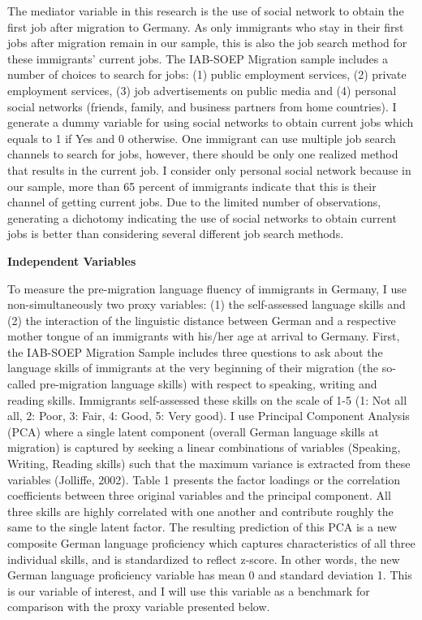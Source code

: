 \documentclass[12pt,a4paper]{article}
\begin{document}
The mediator variable in this research is the use of social network to obtain the first job after migration to Germany. As only immigrants who stay in their first jobs after migration remain in our sample, this is also the job search method for these immigrants' current jobs. The IAB-SOEP Migration sample includes a number of choices to search for jobs: (1) public employment services, (2) private employment services, (3) job advertisements on public media and (4) personal social networks (friends, family, and business partners from home countries). I generate a dummy variable for using social networks to obtain current jobs which equals to 1 if Yes and 0 otherwise. One immigrant can use multiple job search channels to search for jobs, however, there should be only one realized method that results in the current job. I consider only personal social network because in our sample, more than 65 percent of immigrants indicate that this is their channel of getting current jobs. Due to the limited number of observations, generating a dichotomy indicating the use of social networks to obtain current jobs is better than considering several different job search methods. 

\begin{flushleft}
\textbf{Independent Variables} 
\end{flushleft}

To measure the pre-migration language fluency of immigrants in Germany, I use non-simultaneously two proxy variables: (1) the self-assessed language skills and (2) the interaction of the linguistic distance between German and a respective mother tongue of an immigrants with his/her age at arrival to Germany. First, the IAB-SOEP Migration Sample includes three questions to ask about the language skills of immigrants at the very beginning of their migration (the so-called pre-migration language skills) with respect to speaking, writing and reading skills. Immigrants self-assessed these skills on the scale of 1-5 (1: Not all all, 2: Poor, 3: Fair, 4: Good, 5: Very good). I use Principal Component Analysis (PCA) where a single latent component (overall German language skills at migration) is captured by seeking a linear combinations of variables (Speaking, Writing, Reading skills) such that the maximum variance is extracted from these variables (Jolliffe, 2002). Table 1 presents the factor loadings or the correlation coefficients between three original variables and the principal component. All three skills are highly correlated with one another and contribute roughly the same to the single latent factor. The resulting prediction of this PCA is a new composite German language proficiency which captures characteristics of all three individual skills, and is standardized to reflect z-score. In other words, the new German language proficiency variable has mean 0 and standard deviation 1. This is our variable of interest, and I will use this variable as a benchmark for comparison with the proxy variable presented below.
\end{document}
